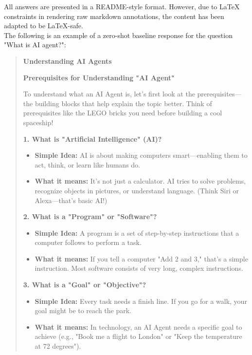 All answers are presented in a README-style format. However, due to LaTeX constraints in rendering raw markdown annotations, the content has been adapted to be LaTeX-safe.\\
The following is an example of a zero-shot baseline response for the question "What is AI agent?":
\begin{quote}
    \label{appendix:zero_shot_without_context_answer}
    \textbf{Understanding AI Agents}

    \textbf{Prerequisites for Understanding "AI Agent"}

    To understand what an AI Agent is, let's first look at the prerequisites—the building blocks that help explain the topic better. Think of prerequisites like the LEGO bricks you need before building a cool spaceship!

    \textbf{1. What is "Artificial Intelligence" (AI)?}

    \begin{itemize}
        \item \textbf{Simple Idea:} AI is about making computers smart—enabling them to act, think, or learn like humans do.
        \item \textbf{What it means:} It's not just a calculator. AI tries to solve problems, recognize objects in pictures, or understand language. (Think Siri or Alexa—that's basic AI!)
    \end{itemize}

    \textbf{2. What is a "Program" or "Software"?}

    \begin{itemize}
        \item \textbf{Simple Idea:} A program is a set of step-by-step instructions that a computer follows to perform a task.
        \item \textbf{What it means:} If you tell a computer "Add 2 and 3," that's a simple instruction. Most software consists of very long, complex instructions.
    \end{itemize}

    \textbf{3. What is a "Goal" or "Objective"?}

    \begin{itemize}
        \item \textbf{Simple Idea:} Every task needs a finish line. If you go for a walk, your goal might be to reach the park.
        \item \textbf{What it means:} In technology, an AI Agent needs a specific goal to achieve (e.g., "Book me a flight to London" or "Keep the temperature at 72 degrees").
    \end{itemize}


\end{quote}
